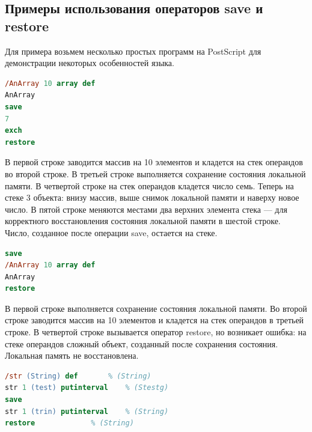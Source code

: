 \documentclass[14pt]{extarticle}
\begin{document}
\subsection{Примеры использования операторов save и restore}

Для примера возьмем несколько простых программ на PostScript для демонстрации некоторых особенностей языка. 


\begin{lstlisting}[label=PostScript-example,caption=Простой объект на стеке операндов после операции save, frame = single, language = PostScript]
/AnArray 10 array def
AnArray
save
7
exch
restore
\end{lstlisting}

В первой строке заводится массив на 10 элементов и кладется на стек операндов во второй строке. В третьей строке выполняется сохранение состояния локальной памяти. В четвертой строке на стек операндов кладется число семь. Теперь на стеке 3 объекта: внизу массив, выше снимок локальной памяти и наверху новое число. В пятой строке меняются местами два верхних элемента стека --- для корректного восстановления состояния локальной памяти в шестой строке. Число, созданное после операции save, остается на стеке.


\begin{lstlisting}[label=PostScript-example,caption=Сложный объект на стеке операндов после операции save, frame = single, language = PostScript]
save
/AnArray 10 array def
AnArray
restore
\end{lstlisting}

В первой строке выполняется сохранение состояния локальной памяти. Во второй строке заводится массив на 10 элементов и кладется на стек операндов в третьей строке. В четвертой строке вызывается оператор restore, но возникает ошибка: на стеке операндов сложный объект, созданный после сохранения состояния. Локальная память не восстановлена.


\begin{lstlisting}[label=PostScript-example,caption=Изменение значения строки, frame = single, language = PostScript]
/str (String) def 		% (String)
str 1 (test) putinterval	% (Stestg)
save
str 1 (trin) putinterval	% (String)
restore				% (String)
\end{lstlisting}
\end{document}
